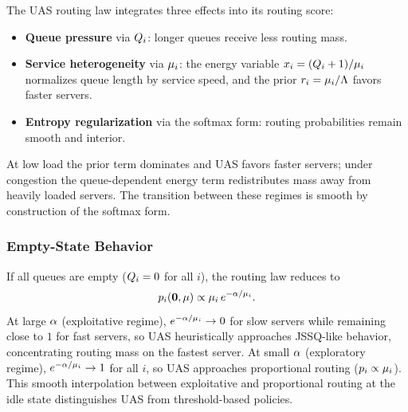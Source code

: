 The UAS routing law integrates three effects into its routing score:
\begin{itemize}
\item \textbf{Queue pressure} via $Q_{i}$: longer queues receive less routing mass.
\item \textbf{Service heterogeneity} via $\mu_i$: the energy variable $x_{i} = (Q_{i}+1)/\mu_i$ normalizes queue length by service speed, and the prior $r_{i} = \mu_i/\Lambda$ favors faster servers.
\item \textbf{Entropy regularization} via the softmax form: routing probabilities remain smooth and interior.
\end{itemize}

At low load the prior term dominates and UAS favors faster servers; under congestion the queue-dependent energy term redistributes mass away from heavily loaded servers. The transition between these regimes is smooth by construction of the softmax form.

\subsubsection{Empty-State Behavior}
If all queues are empty ($Q_{i} = 0$ for all $i$), the routing law reduces to
\begin{equation}
\label{eq:uas_empty_state}
p_i(\mathbf{0}, \mu) \propto \mu_i\, e^{-\alpha/\mu_i}.
\end{equation}
At large $\alpha$ (exploitative regime), $e^{-\alpha/\mu_i} \to 0$ for slow servers while remaining close to $1$ for fast servers, so UAS heuristically approaches JSSQ-like behavior, concentrating routing mass on the fastest server.
At small $\alpha$ (exploratory regime), $e^{-\alpha/\mu_i} \to 1$ for all $i$, so UAS approaches proportional routing ($p_i \propto \mu_i$).
This smooth interpolation between exploitative and proportional routing at the idle state distinguishes UAS from threshold-based policies.


